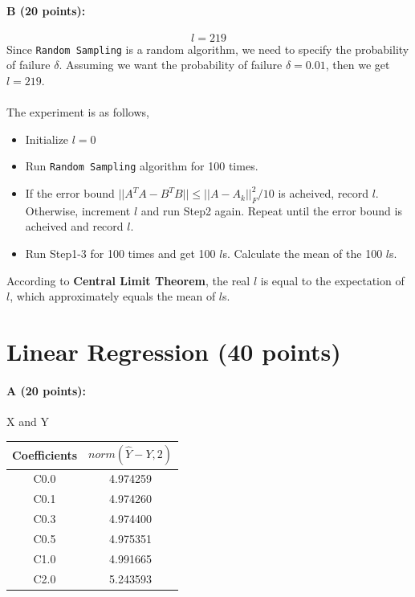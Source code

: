 \documentclass[11pt]{article}
\begin{document}
\paragraph{B (20 points):}
$$l=219$$
Since \texttt{Random Sampling} is a random algorithm, we need to specify the probability of failure $\delta$. Assuming we want the probability of failure $\delta=0.01$, then we get $l=219$.\\\\
The experiment is as follows,
\begin{itemize}
\item Initialize $l = 0$
\item Run \texttt{Random Sampling} algorithm for 100 times.
\item If the error bound $||A^TA-B^TB||\le||A-A_k||_F^2/10$ is acheived, record $l$. Otherwise, increment $l$ and run Step2 again. Repeat until the error bound is acheived and record $l$.
\item Run Step1-3 for 100 times and get 100 $l$s. Calculate the mean of the 100 $l$s.
\end{itemize}
According to \textbf{Central Limit Theorem}, the real $\hat{l}$ is equal to the expectation of $l$, which approximately equals the mean of $l$s.

\section{Linear Regression (40 points)}

\paragraph{A (20 points):} X and Y
\begin{table}[H]
\centering
\begin{tabular}{c|c}
Coefficients & $norm(\hat{Y}-Y,2)$\\
\hline
C0.0 & 4.974259 \\ 
C0.1 & 4.974260 \\ 
C0.3 & 4.974400 \\ 
C0.5 & 4.975351 \\ 
C1.0 & 4.991665 \\ 
C2.0 & 5.243593 \\ 
\end{tabular}
\end{table}
\end{document}
